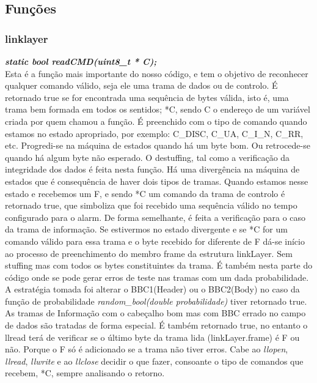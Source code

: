 \documentclass[a4paper]{article}
\begin{document}

\subsection{Funções}
\subsubsection{linklayer}
\textbf{\textit{static bool readCMD(uint8\_t * C);}}\\
Esta é a função mais importante do nosso código, e tem o objetivo de reconhecer
qualquer comando válido, seja ele uma trama de dados ou de controlo. É
retornado true se for encontrada uma sequência de bytes válida, isto é, uma
trama bem formada em todos os sentidos; *C, sendo C o endereço de um variável
criada por quem chamou a função. É preenchido com o tipo de comando
quando estamos no estado apropriado,
por exemplo: C\_DISC, C\_UA, C\_I\_N, C\_RR, etc.
Progredi-se na máquina de estados quando há um byte bom. Ou retrocede-se
quando há algum byte não esperado. O destuffing, tal como a verificação da integridade dos
dados é feita nesta função. Há uma divergência na máquina de estados que é
consequência de haver dois tipos de tramas. Quando estamos nesse estado e
recebemos um F, e sendo *C um comando da trama de controlo é retornado true,
que simboliza que foi recebido uma sequência válido no tempo configurado para o
alarm. De forma semelhante, é feita a verificação para o caso da trama de
informação. Se estivermos no estado divergente e se *C for um comando válido
para essa trama e o byte recebido for diferente de F dá-se início ao processo
de preenchimento do membro frame da estrutura linkLayer. Sem stuffing mas com
todos os bytes constituintes da trama. É também nesta parte do código onde se
pode gerar erros de teste nas tramas com um dada probabilidade. A estratégia
tomada foi alterar o BBC1(Header) ou o BBC2(Body) no caso da função de
probabilidade \textit{random\_bool(double probabilidade)} tiver retornado true.
As tramas de Informação com o cabeçalho bom mas com BBC errado no campo de
dados são tratadas de forma especial. É também retornado true, no entanto o
llread terá de verificar se o último byte da trama lida (linkLayer.frame) é
F ou não. Porque o F só é adicionado se a trama não tiver erros. Cabe ao
\textit{llopen}, \textit{llread}, \textit{llwrite} e ao \textit{llclose} decidir o que fazer, consoante
o tipo de comandos que recebem, *C, sempre analisando o retorno.\linebreak
\end{document}

